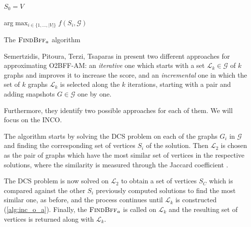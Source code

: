 \begin{algorithm}
	\SetAlgoLined
	$S_{0} = V$ \;


	\Return arg$\max _{i \in \{ 1, \dots, |V|\}} f(S_{i}, \mathcal{G})  $
	\caption{The $\textsc{FindBff}_{a} $ algorithm}
	\label{alg:findbff_a}
\end{algorithm}

Semertzidis, Pitoura, Terzi, Tsaparas in \cite{semertzidis2019finding} present
two different approaches for approximating \acrshort{O2BFF}-AM: an \emph{iterative} one
which starts with a set $\mathcal{L} _{k} \in \mathcal{G} $ of $k$ graphs and improves it to
increase the score, and an \emph{incremental} one in which the set of $k$
graphs $\mathcal{L}_{k} $ is selected along the $k$ iterations, starting with a
pair and adding snapshots $G \in \mathcal{G} $ one by one.

Furthermore, they identify two possible approaches for each of them. We will
focus on the \acrfull{INCO}.

The algorithm starts by solving the \acrshort{DCS} problem on each of the
graphs $G_{i} $ in $\mathcal{G} $ and finding the corresponding set of vertices
$S_{i} $ of the solution. Then $\mathcal{L}_{2}  $ is chosen as the pair of graphs which
have the most similar set of vertices in the respective solutions, where the
similarity is measured through the Jaccard coefficient \footnotemark.

The \acrshort{DCS} problem is now solved on $\mathcal{L} _{2} $ to obtain a set
of vertices $S_C$ which is compared against the other $S_i$ previously computed
solutions to
find the most similar one, as before, and the process continues until
$\mathcal{L}_{k} $ is constructed (\autoref{alg:inc_o_a}). Finally, the
$\textsc{FindBff}_{a} $ is called on $\mathcal{L}_{k}  $ and the resulting set of
vertices is returned along with $\mathcal{L}_{k}  $.

